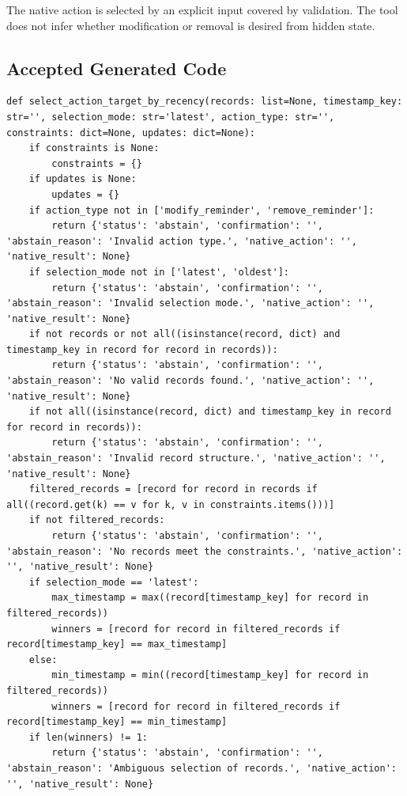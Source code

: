 The native action is selected by an explicit input covered by
validation. The tool does not infer whether modification or removal is
desired from hidden state.

\subsection{Accepted Generated Code}\label{accepted-generated-code-4}

\begin{lstlisting}[style=sagepython,caption={Accepted reminder-recency native-action tool.},label={lst:sage-recency-action-target}]
def select_action_target_by_recency(records: list=None, timestamp_key: str='', selection_mode: str='latest', action_type: str='', constraints: dict=None, updates: dict=None):
    if constraints is None:
        constraints = {}
    if updates is None:
        updates = {}
    if action_type not in ['modify_reminder', 'remove_reminder']:
        return {'status': 'abstain', 'confirmation': '', 'abstain_reason': 'Invalid action type.', 'native_action': '', 'native_result': None}
    if selection_mode not in ['latest', 'oldest']:
        return {'status': 'abstain', 'confirmation': '', 'abstain_reason': 'Invalid selection mode.', 'native_action': '', 'native_result': None}
    if not records or not all((isinstance(record, dict) and timestamp_key in record for record in records)):
        return {'status': 'abstain', 'confirmation': '', 'abstain_reason': 'No valid records found.', 'native_action': '', 'native_result': None}
    if not all((isinstance(record, dict) and timestamp_key in record for record in records)):
        return {'status': 'abstain', 'confirmation': '', 'abstain_reason': 'Invalid record structure.', 'native_action': '', 'native_result': None}
    filtered_records = [record for record in records if all((record.get(k) == v for k, v in constraints.items()))]
    if not filtered_records:
        return {'status': 'abstain', 'confirmation': '', 'abstain_reason': 'No records meet the constraints.', 'native_action': '', 'native_result': None}
    if selection_mode == 'latest':
        max_timestamp = max((record[timestamp_key] for record in filtered_records))
        winners = [record for record in filtered_records if record[timestamp_key] == max_timestamp]
    else:
        min_timestamp = min((record[timestamp_key] for record in filtered_records))
        winners = [record for record in filtered_records if record[timestamp_key] == min_timestamp]
    if len(winners) != 1:
        return {'status': 'abstain', 'confirmation': '', 'abstain_reason': 'Ambiguous selection of records.', 'native_action': '', 'native_result': None}

\end{lstlisting}
